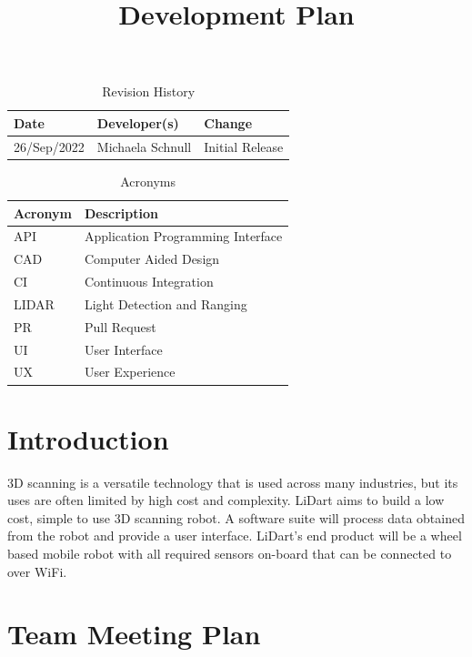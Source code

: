 \documentclass[titlepage]{article}
\title{Development Plan\\\progname}
\author{\authname}
\date{}
\begin{document}
\maketitle

\newpage

\begin{table}[hp]
\caption{Revision History} \label{TblRevisionHistory}
\begin{tabularx}{\textwidth}{llX}
\toprule
\textbf{Date} & \textbf{Developer(s)} & \textbf{Change}\\
\midrule
26/Sep/2022 & Michaela Schnull & Initial Release\\
\bottomrule
\end{tabularx}
\end{table}

\begin{table}[hp]
\caption{Acronyms} \label{Acronyms}
\begin{tabularx}{\textwidth}{lX}
\toprule
\textbf{Acronym} & \textbf{Description} \\
\midrule
API & Application Programming Interface \\
CAD & Computer Aided Design\\
CI & Continuous Integration\\
LIDAR & Light Detection and Ranging\\
PR & Pull Request\\
UI & User Interface\\
UX & User Experience\\
\bottomrule
\end{tabularx}
\end{table}

\newpage

\section{Introduction}

3D scanning is a versatile technology that is used across many industries, but its uses are often limited by high cost and complexity. LiDart aims to build a low cost, simple to use 3D scanning robot. A software suite will process data obtained from the robot and provide a user interface. LiDart's end product will be a wheel based mobile robot with all required sensors on-board that can be connected to over WiFi.

\section{Team Meeting Plan}
\end{document}
